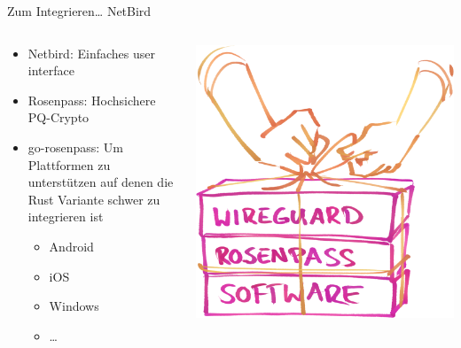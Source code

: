 \documentclass{rosenpass-beamer}
\begin{document}
\begin{frame}{Zum Integrieren… NetBird}
\begin{columns}[c]
\begin{column}{0.7\textwidth}
  \begin{itemize}
    \item Netbird: Einfaches user interface
    \item Rosenpass: Hochsichere PQ-Crypto
    \item
      go-rosenpass: Um Plattformen zu unterstützen auf denen die Rust Variante schwer zu integrieren ist
      \begin{itemize}
        \item Android
        \item iOS
        \item Windows
        \item \dots
      \end{itemize}
  \end{itemize}
\end{column}

\begin{column}{0.2\textwidth}
\includegraphics[width=\linewidth]{graphics/rosenpass in anderen apps.png}


\end{column}
\end{columns}
\end{frame}
\end{document}
